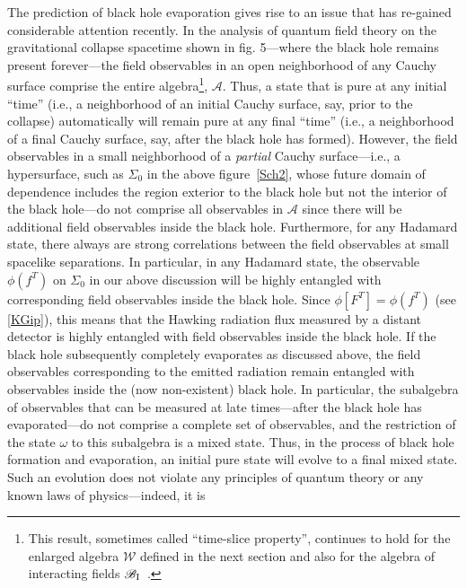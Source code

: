 \documentclass[12pt]{article}
\newcommand{\rI}{{\rm I}}
\newcommand{\eA}{\mathscr{A}}
\newcommand{\eB}{\mathscr{B}}
\newcommand{\eW}{\mathscr{W}}
\theoremstyle{plain}
\theoremstyle{definition}
\begin{document}
The prediction of black hole evaporation gives rise to an issue that has re-gained considerable attention recently. In the analysis of quantum field theory on the gravitational collapse spacetime shown in fig. 5---where the black hole remains present forever---the field observables in an open neighborhood of any Cauchy surface comprise the entire algebra\footnote{This result, 
sometimes called ``time-slice property'', continues to hold for the enlarged algebra $\eW$ defined in the next section and also for the algebra of interacting fields $\eB_\rI$~\cite{hw3,fred5}.}, $\eA$. Thus, a state that is pure at any initial ``time'' (i.e., a neighborhood of an initial Cauchy surface, say, prior to the collapse) automatically will remain pure at any final ``time'' (i.e., a neighborhood of a final Cauchy surface, say, after the black hole has formed). However, the field observables in a small neighborhood of a {\em partial} Cauchy surface---i.e., a hypersurface, such as $\Sigma_0$ in the above figure~\ref{Sch2}, whose future domain of dependence includes the region exterior to the black hole but not the interior of the black hole---do not comprise all observables in $\eA$ since there will be additional field observables inside the black hole. Furthermore, for any Hadamard state, there always are strong correlations between the field observables at small spacelike separations. In particular, in any Hadamard state, the observable $\phi(f^T)$ on $\Sigma_0$ in our above discussion will be highly entangled with corresponding field observables inside the black hole. Since $\phi[F^T] = \phi(f^T)$ (see \eqref{KGip}), this means that the Hawking radiation flux measured by a distant detector is highly entangled with field observables inside the black hole. If the black hole subsequently completely evaporates as discussed above, the field observables corresponding to the emitted radiation remain entangled with observables inside the (now non-existent) black hole. In particular, the subalgebra of observables that can be measured at late times---after the black hole has evaporated---do not comprise a complete set of observables, and the restriction of the state $\omega$ to this subalgebra is a mixed state. Thus, in the process of black hole formation and evaporation, an initial pure state will evolve to a final mixed state. Such an evolution does not violate any principles of quantum theory or any known laws of physics---indeed, it is
\end{document}
